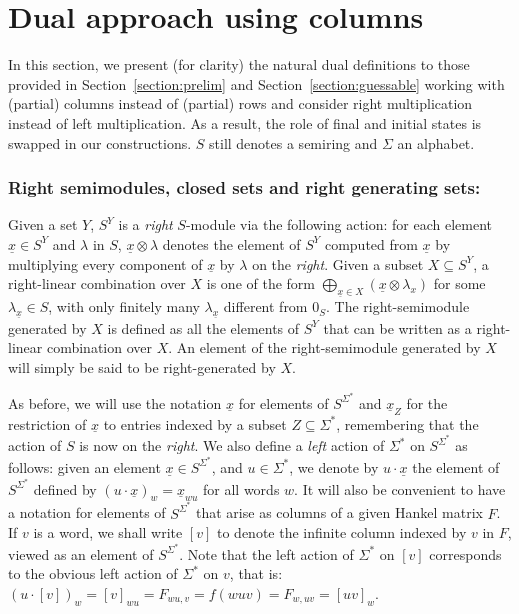 \documentclass{lmcs}
\numberwithin{theorem}{section}
\begin{document}



\newpage
\appendix

\section{Dual approach using columns}
\label{section:swap}

In this section, we present (for clarity) the natural dual definitions to those provided in Section~\ref{section:prelim} and Section~\ref{section:guessable} working with (partial) columns instead of (partial) rows and consider right multiplication instead of left multiplication. As a result, the role of final and initial states is swapped in our constructions. $S$ still denotes a semiring and $\Sigma$ an alphabet.

\subsubsection*{\textbf{Right semimodules, closed sets and right generating sets:}} Given a set $Y$, $S^Y$ is a \emph{right} $S$-module via the following action:  for each element $\underline{x} \in S^Y$ and $\lambda$ in $S$, $\underline{x} \otimes \lambda$ denotes the element of $S^Y$ computed from $\underline{x}$ by multiplying every component of $\underline{x}$ by $\lambda$ on the \emph{right}.  Given a subset $X \subseteq S^Y$, a right-linear combination over $X$ is one of the form $\bigoplus_{\underline{x} \in X} (\underline{x} \otimes \lambda_x)$ for some $\lambda_{\underline{x}} \in S$, with only finitely many $\lambda_{\underline{x}}$ different from $0_S$. The right-semimodule generated by $X$ is defined as all the elements of $S^Y$ that can be written as a right-linear combination over $X$. An element of the right-semimodule generated by $X$ will simply be said to be right-generated by $X$. 

As before, we will use the notation $\underline{x}$ for elements of $S^{\Sigma^*}$ and $\underline{x}_Z$ for the restriction of $\underline{x}$ to entries indexed by a subset $Z \subseteq \Sigma^*$, remembering that the action of $S$ is now on the \emph{right}. We also define a \emph{left} action of $\Sigma^*$ on $S^{\Sigma^*}$ as follows: given an element $\underline{x} \in S^{\Sigma^*}$, and $u \in \Sigma^*$, we denote by $u \cdot \underline{x}$ the element of $S^{\Sigma^*}$ defined by $(u\cdot \underline{x})_w = \underline{x}_{wu}$ for all words $w$. It will also be convenient to have a notation for elements of $S^{\Sigma^{*}}$ that arise as columns of a given Hankel matrix $F$. If $v$ is a word, we shall write $[ v ]$ to denote the infinite column indexed by $v$ in
$F$, viewed as an element of $S^{\Sigma^*}$. Note that the left action of $\Sigma^*$ on $[v]$ corresponds to the obvious left action of $\Sigma^*$ on $v$, that is: $(u \cdot [v])_w = [v]_{wu}= F_{wu,v} = f(wuv) = F_{w,uv} = [ uv ]_{w}$. 
\end{document}
